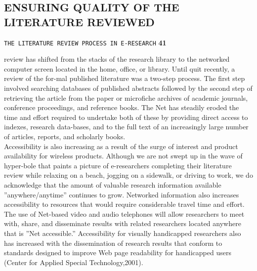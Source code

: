 \documentclass[a4,9pt]{beamer}
\begin{document}
\begin{frame}
\section*{ENSURING QUALITY OF THE LITERATURE REVIEWED}
\begin{flushright}
 \texttt{THE LITERATURE REVIEW PROCESS IN E-RESEARCH} \hspace*{1cm} \textbf{41}
\end{flushright}

\vspace*{0.5cm}
review has shifted from the stacks of the research library to the networked computer screen located in the home, office, or library. Until quit recently, a review of the for-mal published literature was a two-step process. The first step involved searching databases of published abstracts followed by the second step of retrieving the article from the paper or microfiche archives of academic journals, conference proceedings, and reference books. The Net has steadily eroded the time and effort required to undertake both of these by providing direct access to indexes, research data-bases, and to the full text of an increasingly large number of articles, reports, and scholarly books.\\
\hspace*{0.5cm} Accessibility is also increasing as a result of the surge of interest and product availability for wireless products. Although we are not swept up in the wave of hyper-bole that paints a picture of e-researchers completing their literature review while relaxing on a beach, jogging on a sidewalk, or driving to work, we do acknowledge that the amount of valuable research information available ''anywhere/anytime'' continues to grow. Networked information also increases accessibility to resources that would require considerable travel time and effort. The use of Net-based video and audio telephones will allow researchers to meet with, share, and disseminate results with related researchers located anywhere that is ''Net accessible.'' Accessibility for visually handicapped researchers also has increased with the dissemination of research results that conform to standards designed to improve Web page readability for handicapped users (Center for Applied Special Technology,2001).\\

\vspace*{0.5cm} 
\end{frame}
\end{document}

